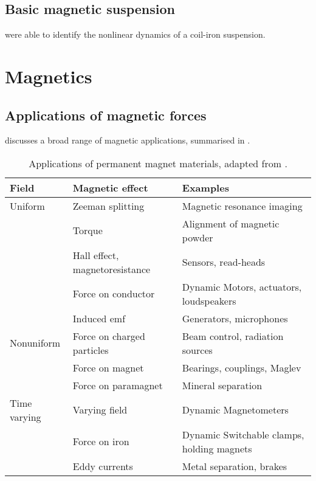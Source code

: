 \subsection{Basic magnetic suspension}

\textcite{agamennoni2004} were able to identify the nonlinear dynamics
of a coil-iron suspension.

\section{Magnetics}

\subsection{Applications of magnetic forces}

\textcite{coey2002} discusses a broad range of magnetic applications,
summarised in .

\begin{table}
\begin{wide}
\begin{tabular}{@{}lll@{}}
\toprule
Field & Magnetic effect & Examples \\
\midrule
Uniform & Zeeman splitting & Magnetic resonance imaging \\
& Torque & Alignment of magnetic powder \\
& Hall effect, magnetoresistance & Sensors, read-heads \\
& Force on conductor & Dynamic Motors, actuators, loudspeakers \\
& Induced emf & Generators, microphones \\
Nonuniform & Force on charged particles & Beam control, 
radiation sources %
\\
& Force on magnet & Bearings, couplings, Maglev \\
& Force on paramagnet & Mineral separation \\
Time varying & Varying field & Dynamic Magnetometers \\
& Force on iron & Dynamic Switchable clamps, holding magnets \\
& Eddy currents & Metal separation, brakes \\
\bottomrule
\end{tabular}
\end{wide}
\caption{Applications of permanent magnet materials, 
adapted from \textcite{coey2002}.}
\end{table}

